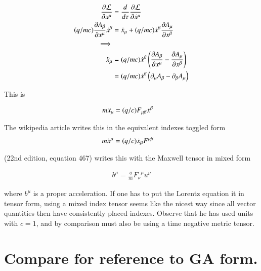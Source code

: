 \begin{align*}
\PD{x^\mu}{\LL} &= \frac{d}{d\tau} \PD{\xdot^\mu}{\LL} \\
(q/mc) \PD{x^\mu}{A_\beta} \xdot^\beta &= \xddot_\mu + (q/mc) \xdot^\beta \PD{x^\beta}{A_\mu} \\
\implies \\
\xddot_\mu
&= (q/mc) \xdot^\beta \left( \PD{x^\mu}{A_\beta} - \PD{x^\beta}{A_\mu} \right) \\
&= (q/mc) \xdot^\beta \left( \partial_\mu {A_\beta} - \partial_{\beta}{A_\mu} \right) \\
\end{align*}

This is

\begin{align}\label{eqn:maxwell_tensor_lagrangian:fromLagrangian}
m \xddot_\mu &= (q/c) F_{\mu\beta} \xdot^\beta 
\end{align}

The wikipedia article \cite{wiki:LorentzForce} writes this in the equivalent indexes toggled form
\begin{align*}
m \xddot^\mu &= (q/c) \xdot_\beta F^{\mu\beta}
\end{align*}

\cite{schiller:mm} (22nd edition, equation 467) writes this with the
Maxwell tensor in mixed form

\begin{align*}
b^\mu = \frac{q}{m} {F_\nu}^\mu u^\nu
\end{align*}

where $b^\mu$ is a proper acceleration.  If one has to put the Lorentz 
equation it in tensor
form, using a mixed index tensor seems like the nicest way since all
vector quantities then have consistently placed indexes.  Observe that he has used units with $c=1$, and by comparison must
also be using a time negative metric tensor.

%

\section{Compare for reference to GA form. }

